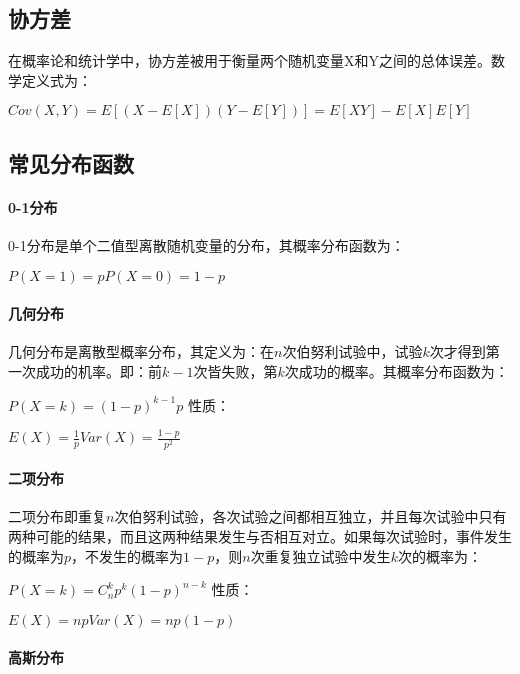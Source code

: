 \documentclass[11pt]{book}
\newcounter{#2}
\newcounter{#2}[#1]
\numberwithin{#2}{#1}
\begin{document}
\subsection{协方差}

在概率论和统计学中，协方差被用于衡量两个随机变量X和Y之间的总体误差。数学定义式为：

$ Cov\left( X,Y \right) =E\left[ \left( X-E\left[ X \right]  \right) \left( Y-E\left[ Y \right]  \right) \right] =E\left[ XY \right] -E\left[ X \right] E\left[ Y \right] $ 

\subsection{常见分布函数}

\paragraph{0-1分布}

0-1分布是单个二值型离散随机变量的分布，其概率分布函数为：

$ P\left( X=1 \right) =pP\left( X=0 \right) =1-p $
\paragraph{几何分布}

几何分布是离散型概率分布，其定义为：在$ n $次伯努利试验中，试验$ k $次才得到第一次成功的机率。即：前$ k-1 $次皆失败，第$ k $次成功的概率。其概率分布函数为：

$ P\left( X=k \right) =\left( 1-p \right) ^{k-1} p $
性质：

$ E\left( X \right) =\frac{1}{p} Var\left( X \right) =\frac{1-p}{p^{2} }  $
\paragraph{二项分布}

二项分布即重复$ n $次伯努利试验，各次试验之间都相互独立，并且每次试验中只有两种可能的结果，而且这两种结果发生与否相互对立。如果每次试验时，事件发生的概率为$ p $，不发生的概率为$ 1-p $，则$ n $次重复独立试验中发生$ k $次的概率为：

$ P\left( X=k \right) =C_{n}^{k} p^{k} \left( 1-p \right) ^{n-k}  $
性质：

$ E\left( X \right) =npVar\left( X \right) =np\left( 1-p \right)  $

\paragraph{高斯分布}
\end{document}
